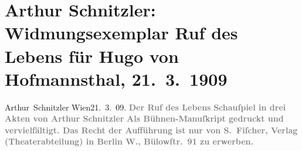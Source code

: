 

         
         \newcommand{\erwaehntePersonen}{Personen: Hugo von Hofmannsthal}
         \newcommand{\erwaehnteInstitutionen}{Institutionen: S. Fischer Verlag}
         \newcommand{\erwaehnteOrte}{Orte: Bülowstraße, Wien}
         \newcommand{\erwaehnteWerke}{Werke: Der Ruf des Lebens. Schauspiel in drei Akten}
               \section[Arthur Schnitzler: Widmungsexemplar Ruf des Lebens für Hugo von Hofmannsthal, 21. 3. 1909]{ Arthur Schnitzler: Widmungsexemplar Ruf des Lebens für Hugo von
                    Hofmannsthal, 21. 3. 1909}\nopagebreak{}\rehead{ }\begin{ledgroupsized}[t]{13cm}\normalsize\beginnumbering \toendnotes[C]{\smallbreak\pagebreak[2]} 
\pstart \spacefill\mbox{{\pb}Arthur Schnitzler}\pend{}\pstart
           Wien21. 3. 09.\pend
           {\bigskip}\pstart
           \noindent{}{\pb}\textcolor{gray}{\textbf{Der Ruf des Lebens}}\pend
           \pstart
           \textcolor{gray}{\textbf{Schauſpiel in drei Akten von Arthur Schnitzler}}\pend
           {\bigskip}\pstart
           \noindent{}\textcolor{gray}{\textbf{Als Bühnen-Manuſkript gedruckt und vervielfältigt. Das
                        Recht der Aufführung ist nur von S. Fiſcher,
                            Verlag (Theaterabteilung) in Berlin W.,
                            Bülowſtr. 91 zu erwerben.}}\pend
           
         
         \endnumbering{}\end{ledgroupsized}  \newcommand{\dateiname}{L01833}\newcommand{\titel}{Arthur Schnitzler: Widmungsexemplar Ruf des Lebens für Hugo von Hofmannsthal, 21. 3. 1909}\newcommand{\editorInnen}{Martin Anton Müller und Gerd-Hermann Susen}
      